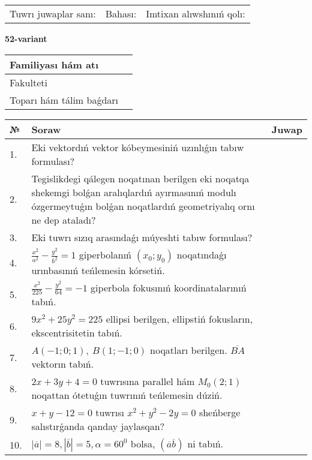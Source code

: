 \documentclass{article}
\begin{document}
\vspace{1cm}

\begin{tabular}{lll}
Tuwrı juwaplar sanı: \underline{\hspace{1.5cm}} & 
Bahası: \underline{\hspace{1.5cm}} & 
Imtixan alıwshınıń qolı: \underline{\hspace{2cm}} \\
\end{tabular}

\egroup

\newpage


\textbf{52-variant}\\

\bgroup
\def\arraystretch{1.6} %

\begin{tabular}{|m{5.7cm}|m{9.5cm}|}
\hline
Familiyası hám atı & \\
\hline
Fakulteti  & \\
\hline
Toparı hám tálim baǵdarı  & \\
\hline
\end{tabular}

\vspace{1cm}

\begin{tabular}{|m{0.7cm}|m{10cm}|m{4cm}|}
\hline
№ & Soraw & Juwap \\
\hline
1. & Eki vektordıń vektor kóbeymesiniń uzınlıǵın tabıw formulası? &  \\
\hline
2. & Tegislikdegi qálegen noqatınan berilgen eki noqatqa shekemgi bolǵan aralıqlardıń ayırmasınıń modulı ózgermeytuǵın bolǵan noqatlardıń geometriyalıq ornı ne dep ataladı? &  \\
\hline
3. & Eki tuwrı sızıq arasındaǵı múyeshti tabıw formulası? &  \\
\hline
4. & $\frac{x^2}{a^2}-\frac{y^2}{b^2}=1$ giperbolanıń $(x_0;y_0)$ noqatındaǵı urınbasınıń teńlemesin kórsetiń. &  \\
\hline
5. & $\frac{x^{2}}{225}-\frac{y^{2}}{64}=-1$ giperbola fokusınıń koordinatalarınıń tabıń. &  \\
\hline
6. & $9x^{2}+25y^{2}=225$ ellipsi berilgen, ellipstiń fokusların, ekscentrisitetin tabıń. &  \\
\hline
7. & $A (-1;0;1),\ B (1;-1;0)$ noqatları berilgen. $\overline{BA}$ vektorın tabıń. &  \\
\hline
8. & $2x+3y+4=0$ tuwrısına parallel hám $M_{0} (2;1)$ noqattan ótetuǵın tuwrınıń teńlemesin dúziń. &  \\
\hline
9. & $x+y-12=0$ tuwrısı $x^{2}+y^{2}-2y=0$ sheńberge salıstırǵanda qanday jaylasqan? &  \\
\hline
10. & $\left| \overline{a} \right|=8, \left| \overline{b} \right|=5, \alpha=60^{0}$ bolsa, $( \overline{a}\overline{b} )$ ni tabıń. &  \\
\hline
\end{tabular}
\end{document}

